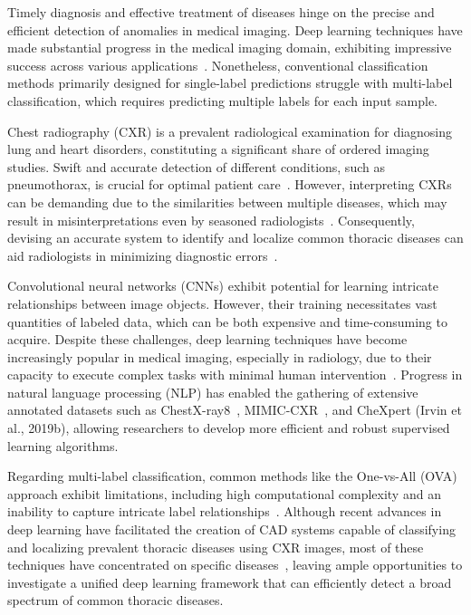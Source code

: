 \documentclass[preprint,3p,times, review]{elsarticle}
\begin{document}
Timely diagnosis and effective treatment of diseases hinge on the precise and efficient detection of anomalies in medical imaging. Deep learning techniques have made substantial progress in the medical imaging domain, exhibiting impressive success across various applications~\cite{litjens_Survey_2017a}. Nonetheless, conventional classification methods primarily designed for single-label predictions struggle with multi-label classification, which requires predicting multiple labels for each input sample.

Chest radiography (CXR) is a prevalent radiological examination for diagnosing lung and heart disorders, constituting a significant share of ordered imaging studies. Swift and accurate detection of different conditions, such as pneumothorax, is crucial for optimal patient care~\cite{bellaviti_Increased_2016}. However, interpreting CXRs can be demanding due to the similarities between multiple diseases, which may result in misinterpretations even by seasoned radiologists~\cite{delrue_Difficulties_2011}. Consequently, devising an accurate system to identify and localize common thoracic diseases can aid radiologists in minimizing diagnostic errors~\cite{crisp_Global_2014,silverstein_Most_2016}.

Convolutional neural networks (CNNs) exhibit potential for learning intricate relationships between image objects. However, their training necessitates vast quantities of labeled data, which can be both expensive and time-consuming to acquire. Despite these challenges, deep learning techniques have become increasingly popular in medical imaging, especially in radiology, due to their capacity to execute complex tasks with minimal human intervention~\cite{jaderberg_Spatial_2015}. Progress in natural language processing (NLP) has enabled the gathering of extensive annotated datasets such as ChestX-ray8~\cite{wang_ChestXRay8_2017}, MIMIC-CXR~\cite{johnson_MIMICCXR_2019}, and CheXpert (Irvin et al., 2019b), allowing researchers to develop more efficient and robust supervised learning algorithms.

Regarding multi-label classification, common methods like the One-vs-All (OVA) approach exhibit limitations, including high computational complexity and an inability to capture intricate label relationships~\cite{tsoumakas_MultiLabel_2007}. Although recent advances in deep learning have facilitated the creation of CAD systems capable of classifying and localizing prevalent thoracic diseases using CXR images, most of these techniques have concentrated on specific diseases~\cite{jaiswal_Identifying_2019,lakhani_Deep_2017,pasa_Efficient_2019,ausawalaithong_Automatic_2018}, leaving ample opportunities to investigate a unified deep learning framework that can efficiently detect a broad spectrum of common thoracic diseases.
\end{document}
